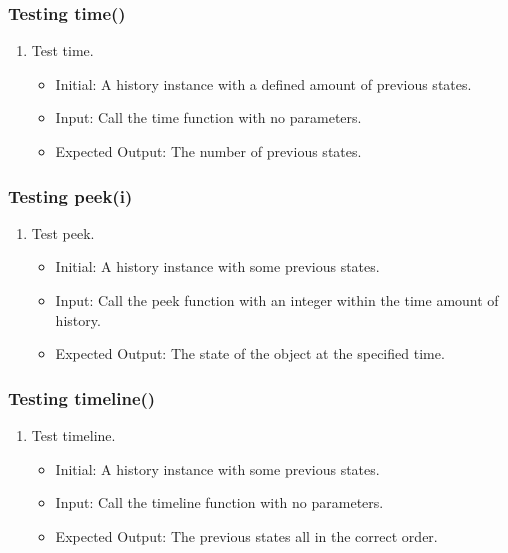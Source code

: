 \documentclass[12pt, titlepage]{article}
\begin{document}
\subsubsection {Testing time()}
\begin{enumerate}
	\item Test time. \begin{itemize}
		      \item Initial: A history instance with a defined amount of previous states.
		      \item Input: Call the time function with no parameters.
		      \item Expected Output: The number of previous states.
	      \end{itemize}
\end{enumerate}

\subsubsection {Testing peek(i)}
\begin{enumerate}
	\item Test peek. \begin{itemize}
		      \item Initial: A history instance with some previous states.
		      \item Input: Call the peek function with an integer within the time amount of history.
		      \item Expected Output: The state of the object at the specified time.
	      \end{itemize}
\end{enumerate}

\subsubsection {Testing timeline()}
\begin{enumerate}
	\item Test timeline. \begin{itemize}
		      \item Initial: A history instance with some previous states.
		      \item Input: Call the timeline function with no parameters.
		      \item Expected Output: The previous states all in the correct order.
	      \end{itemize}
\end{enumerate}
\end{document}
